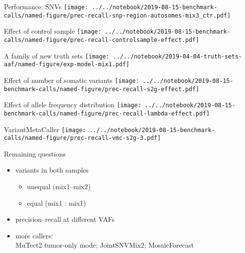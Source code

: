 \documentclass{beamer}
\begin{document}

\begin{frame}{Performance: SNVs}
\texttt{[image: ../../notebook/2019-08-15-benchmark-calls/named-figure/prec-recall-snp-region-autosomes-mix3\_ctr.pdf]}
\end{frame}

\begin{frame}{Effect of control sample}
\texttt{[image: ../../notebook/2019-08-15-benchmark-calls/named-figure/prec-recall-controlsample-effect.pdf]}
\end{frame}

\begin{frame}{A family of new truth sets}
\texttt{[image: ../../notebook/2019-04-04-truth-sets-aaf/named-figure/exp-model-mix1.pdf]}
\end{frame}

\begin{frame}{Effect of number of somatic variants}
\texttt{[image: ../../notebook/2019-08-15-benchmark-calls/named-figure/prec-recall-s2g-effect.pdf]}
\end{frame}

\begin{frame}{Effect of allele frequency distribution}
\texttt{[image: ../../notebook/2019-08-15-benchmark-calls/named-figure/prec-recall-lambda-effect.pdf]}
\end{frame}

\begin{frame}[plain]{VariantMetaCaller}
\texttt{[image: ../../notebook/2019-08-15-benchmark-calls/named-figure/prec-recall-vmc-s2g-3.pdf]}
\end{frame}


\begin{frame}{Remaining questions}
\begin{itemize}
\item variants in both samples
\begin{itemize}
\item unequal (mix1--mix2)
\item equal (mix1 : mix1)
\end{itemize}
\item precision--recall at different VAFs
\item more callers:\\MuTect2 tumor-only mode; JointSNVMix2; MosaicForecast
\end{itemize}
\end{frame}
\end{document}
